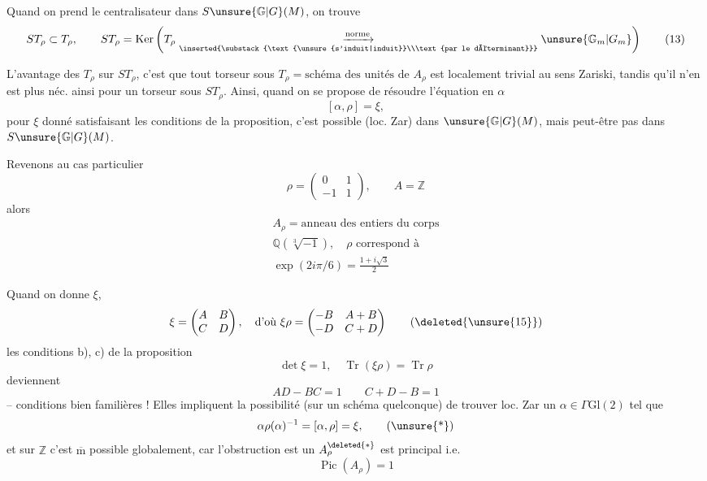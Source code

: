 Quand on prend le centralisateur dans
$S\unsure{\mathbb G|G}(M)$, on trouve
\[
ST_\rho\subset T_\rho,\qquad
ST_\rho=\operatorname{Ker}\left(
T_\rho
\underset{\inserted{\substack{\text{\unsure{s'induit|induit}}\\\text{par le déterminant}}}}
{\xrightarrow{\text{norme}}}\unsure{\mathbb G_m|G_m}\right)
\tag{13}
\]

L'avantage des $T_\rho$ sur $ST_\rho$, c'est que
tout torseur sous $T_\rho=\text{schéma des unités de }A_\rho$
est localement trivial au sens Zariski, tandis
qu'il n'en est plus néc. ainsi pour
un torseur sous $ST_\rho$. Ainsi, quand
on se propose de résoudre l'équation en $\alpha$
\[
[\alpha,\rho]=\xi,
\]
pour $\xi$ donné satisfaisant les conditions de la
proposition, c'est possible (loc. Zar) dans
$\unsure{\mathbb G|G}(M)$, mais peut-être pas dans $S\unsure{\mathbb G|G}(M)$.



Revenons au cas particulier
\[
\rho=\begin{pmatrix}0&1\\-1&1\end{pmatrix},\qquad A=\mathbb Z
\]
alors
\[
\begin{gathered}
A_\rho=\text{anneau des entiers du corps}\\
\mathbb Q(\sqrt[3]{-1}),\quad \rho\text{ correspond à}\\
\exp(2i\pi/6)=\frac{1+i\sqrt3}{2}
\end{gathered}
\tag{14}
\]

Quand on  donne $\xi$, 
\[
\xi=\begin{pmatrix}A&B\\C&D\end{pmatrix},\quad
\text{d'où }\xi\rho=
\begin{pmatrix}-B&A+B\\-D&C+D\end{pmatrix}
\tag{\deleted{\unsure{15}}}
\]
les conditions  b), c) de la proposition
\[
\det\xi=1,\quad \operatorname{Tr}(\xi\rho)=\operatorname{Tr}\rho
\]
 deviennent
\[
AD-BC=1\qquad C+D-B=1
\tag{16}
\]
-- conditions bien familières ! Elles impliquent
la possibilité  (sur un schéma quelconque)
de trouver loc. Zar un $\alpha\in\Gamma\mathrm{Gl}(2)$
tel que 
\[
\alpha\rho(\alpha)^{-1}=[\alpha,\rho]=\xi,
\tag{\unsure{*}}
\]
et sur $\mathbb Z$ c'est $\overline{\mathrm m}$ possible globalement,
car l'obstruction est un 
$A_\rho^{\deleted{*}}$ est principal  i.e. 
\[
\operatorname{Pic}(A_\rho)=1
\tag{17}
\]

